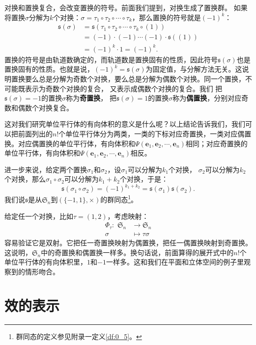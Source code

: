 \documentclass[12pt,UTF8,fontset=none]{ctexbook}
\begin{document}
对换和置换复合，会改变置换的符号。前面我们提到，对换生成了置换群。
如果将置换$\sigma$分解为$k$个对换：$\sigma = \tau_1 \circ \tau_2 \circ \cdots \circ \tau_k$，那么置换的符号就是$(-1)^k$：
\begin{align*}
    \mathfrak{s}(\sigma) &= \mathfrak{s}(\tau_1 \circ \tau_2 \circ \cdots \circ \tau_k \circ (1))  \\
    &= (-1) \cdot (-1) \cdots (-1) \cdot \mathfrak{s}((1))  \\
    &= (-1)^k \cdot 1 = (-1)^k.
\end{align*}
置换的符号是由轨道数确定的，而轨道数是置换固有的性质，因此符号$\mathfrak{s}(\sigma)$也是置换固有的性质。也就是说，$(-1)^k=\mathfrak{s}(\sigma)$为固定值，与分解方法无关。这说明置换要么总是分解为奇数个对换，要么总是分解为偶数个对换。同一个置换，不可能既表示为奇数个对换的复合，
又表示成偶数个对换的复合。我们
把$\mathfrak{s}(\sigma) = -1$的置换$\sigma$称为\textbf{奇置换}，
把$\mathfrak{s}(\sigma) = 1$的置换$\sigma$称为\textbf{偶置换}，分别对应奇数和偶数个对换复合。

这对我们研究单位平行体的有向体积的意义是什么呢？以上结论告诉我们，我们可以把前面列出的$n!$个单位平行体分为两类，一类的下标对应奇置换，一类对应偶置换。对应偶置换的单位平行体，有向体积和$\varPsi(\mathbf{e}_{1}, \mathbf{e}_{2},\cdots,\mathbf{e}_{n})$相同；对应奇置换的单位平行体，有向体积和$\varPsi(\mathbf{e}_{1}, \mathbf{e}_{2},\cdots,\mathbf{e}_{n})$相反。

进一步来说，给定两个置换$\sigma_1$和$\sigma_2$，设$\sigma_1$可以分解为$k_1$个对换，
$\sigma_2$可以分解为$k_2$个对换，那么$\sigma_1\circ\sigma_2$可以分解为$k_1+k_2$个对换，于是：
$$\mathfrak{s}(\sigma_1\circ\sigma_2) = (-1)^{k_1+k_2} = \mathfrak{s}(\sigma_1)\mathfrak{s}(\sigma_2).$$
我们说$\mathfrak{s}$是从$\mathfrak{S}_n$到$\left(\{-1,1\}, \times \right)$的群同态\footnote{群同态的定义参见附录一定义\ref{df:0_5}。}。

给定任一个对换，比如$\tau = (1,2)$，考虑映射：
\begin{align*}
    \Phi_\tau : \,\, \mathfrak{S}_n &\rightarrow \mathfrak{S}_n  \\
    \sigma &\mapsto \tau\sigma 
\end{align*} 
容易验证它是双射。它把任一奇置换映射为偶置换，把任一偶置换映射到奇置换。
这说明，$\mathfrak{S}_n$中的奇置换和偶置换一样多。换句话说，前面算得的展开式中的$n!$个单位平行体的有向体积里，$1$和$-1$一样多。这和我们在平面和立体空间的例子里观察到的情形吻合。

\section{效的表示}
\end{document}
